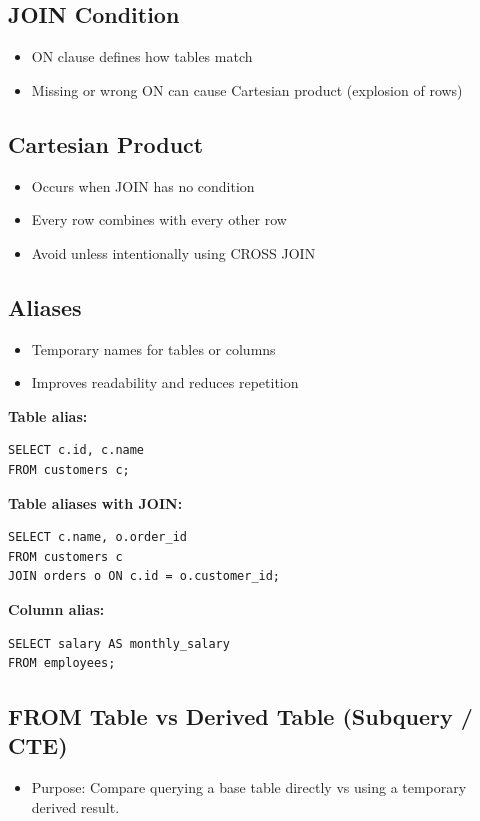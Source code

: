 \documentclass[10pt]{article}
\begin{document}
\subsection{JOIN Condition}
\begin{itemize}
\item ON clause defines how tables match
\item Missing or wrong ON can cause Cartesian product (explosion of rows)
\end{itemize}

\subsection{Cartesian Product}
\begin{itemize}
\item Occurs when JOIN has no condition
\item Every row combines with every other row
\item Avoid unless intentionally using CROSS JOIN
\end{itemize}

\subsection{Aliases}
\begin{itemize}
\item Temporary names for tables or columns
\item Improves readability and reduces repetition
\end{itemize}

\textbf{Table alias:}

\begin{verbatim}
SELECT c.id, c.name
FROM customers c;
\end{verbatim}

\textbf{Table aliases with JOIN:}

\begin{verbatim}
SELECT c.name, o.order_id
FROM customers c
JOIN orders o ON c.id = o.customer_id;
\end{verbatim}

\textbf{Column alias:}

\begin{verbatim}
SELECT salary AS monthly_salary
FROM employees;
\end{verbatim}

\subsection{FROM Table vs Derived Table (Subquery / CTE)}
\begin{itemize}
    \item Purpose: Compare querying a base table directly vs using a temporary derived result.
\end{itemize}
\end{document}
